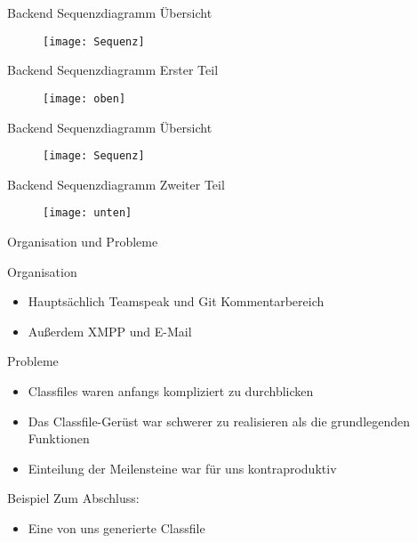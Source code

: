 \begin{frame}[fragile]{Backend Sequenzdiagramm Übersicht}
\begin{figure}[htp]
\begin{center}
\texttt{[image: Sequenz]}
\end{center}
\end{figure}
\end{frame}

\begin{frame}[fragile]{Backend Sequenzdiagramm Erster Teil}
\begin{figure}[htp]
\begin{center}
\texttt{[image: oben]}
\end{center}
\end{figure}
\end{frame}

\begin{frame}[fragile]{Backend Sequenzdiagramm Übersicht}
\begin{figure}[htp]
\begin{center}
\texttt{[image: Sequenz]}
\end{center}
\end{figure}
\end{frame}

\begin{frame}[fragile]{Backend Sequenzdiagramm Zweiter Teil}
\begin{figure}[htp]
\begin{center}
\texttt{[image: unten]}
\end{center}
\end{figure}
\end{frame}


\begin{frame}[fragile]{Organisation und Probleme}

\pause
Organisation
\pause
  \begin{itemize}
  \item Hauptsächlich Teamspeak und Git Kommentarbereich
  \pause
  \item Außerdem XMPP und E-Mail 
  \pause
  \end{itemize}
Probleme
\pause
  \begin{itemize}
  \item Classfiles waren anfangs kompliziert zu durchblicken
  \pause
  \item Das Classfile-Gerüst war schwerer zu realisieren als die grundlegenden Funktionen
  \pause
  \item Einteilung der Meilensteine war für uns kontraproduktiv
  \end{itemize}
\end{frame}

\begin{frame}[fragile]{Beispiel}
Zum Abschluss:
  \begin{itemize}
  \item Eine von uns generierte Classfile
  \end{itemize}
\end{frame}
